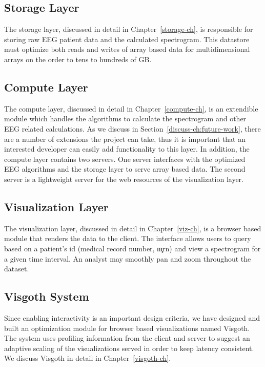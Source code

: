 \subsection{Storage Layer}

The storage layer, discussed in detail in Chapter~\ref{storage-ch}, is
responsible for storing raw EEG patient data and the calculated spectrogram.
This datastore must optimize both reads and writes of array based data for
multidimensional arrays on the order to tens to hundreds of GB.

\subsection{Compute Layer}

The compute layer, discussed in detail in Chapter~\ref{compute-ch}, is an
extendible module which handles the algorithms to calculate the spectrogram and
other EEG related calculations. As we discuss in
Section~\ref{discuss-ch:future-work}, there are a number of extensions the
project can take, thus it is important that an interested developer can easily
add functionality to this layer. In addition, the compute layer contains two
servers. One server interfaces with the optimized EEG algorithms and the
storage layer to serve array based data. The second server is a lightweight
server for the web resources of the visualization layer.

\subsection{Visualization Layer}

The visualization layer, discussed in detail in Chapter~\ref{viz-ch}, is a browser
based module that renders the data to the client. The interface allows users to
query based on a patient's id (medical record number, \c{mrn}) and view a spectrogram
for a given time interval. An analyst may smoothly pan and zoom throughout the dataset.

\subsection{Visgoth System}

Since enabling interactivity is an important design criteria, we have designed
and built an optimization module for browser based visualizations named
Visgoth. The system uses profiling information from the client and server to
suggest an adaptive scaling of the visualizations served in order to keep
latency consistent. We discuss Visgoth in detail in Chapter~\ref{visgoth-ch}.

